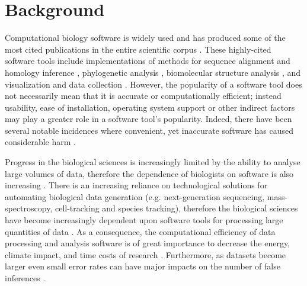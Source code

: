 \documentclass{bmcart}
\begin{document}


\section*{Background}
Computational biology software is widely used and has produced some of
the most cited publications in the entire scientific corpus
\cite{Perez-Iratxeta2007-lv,Van_Noorden2014-kc,Wren2016-xy}. These
highly-cited software tools include implementations of methods for sequence
alignment and homology inference \cite{Altschul1990-ht,Thompson1994-eu,Thompson1997-rl,Altschul1997-ga},
phylogenetic analysis \cite{Felsenstein1985-lj,Saitou1987-zl,Posada1998-qq,Ronquist2003-yh,Tamura2007-ei}, 
biomolecular structure analysis \cite{Sheldrick1990-kc,Sheldrick2008-xy,Jones1991-ik,Laskowski1993-vi,Otwinowski1997-xj}, and
visualization and data collection \cite{Kraulis1991-lt,Berman2000-to}. 
However, the popularity of a
software tool does not necessarily mean that it is accurate or
computationally efficient{\color{black};} instead usability, ease of installation,
operating system support or other indirect factors may play a greater role in a software
tool's popularity. Indeed, there have been several notable incidences where
convenient, yet inaccurate software has caused considerable harm
\cite{leveson1993investigation,cummings2020regulating,Herkert:2020}.

Progress in the biological sciences is increasingly limited by the
ability to analyse large volumes of data, therefore the
dependence of biologists on software is also increasing
\cite{Marx2013-zi}. There is an increasing reliance on technological
solutions for automating biological data generation
(e.g. next-generation sequencing, mass-spectroscopy, cell-tracking and
species tracking), therefore the biological sciences have become
increasingly dependent upon software tools for processing
large quantities of data \cite{Marx2013-zi}. As a consequence, the
computational efficiency of data processing and analysis software is
of great importance to decrease the energy, climate impact, and time costs of research
\cite{Gombiner2011-md}. Furthermore,  as datasets become
larger even small error rates can have
major impacts on the number of false inferences \cite{Storey2003-cv}.
\end{document}
